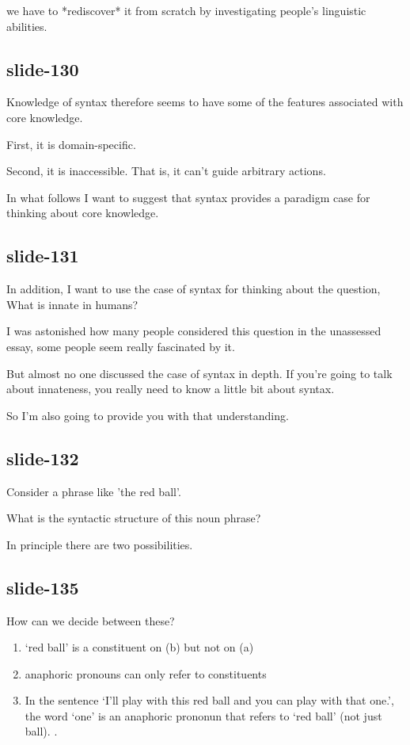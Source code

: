 \documentclass[12pt,\papersize]{extarticle}
\begin{document}
we have to *rediscover* it from scratch by investigating people's linguistic abilities.

\subsection{slide-130}
Knowledge of syntax therefore seems to have some of the features associated with core knowledge.

First, it is domain-specific.

Second, it is inaccessible.  That is, it can't guide arbitrary actions.

In what follows I want to suggest that syntax provides a paradigm case for thinking about core knowledge.

\subsection{slide-131}
In addition, I want to use the case of syntax for thinking about the question, What is innate in humans?

I was astonished how many people considered this question in the unassessed essay, some people seem really fascinated by it.

But almost no one discussed the case of syntax in depth.  If you're going to talk about innateness, you really need to know a little bit about syntax.

So I'm also going to provide you with that understanding.

\subsection{slide-132}
Consider a phrase like 'the red ball'.

What is the syntactic structure of this noun phrase?

In principle there are two possibilities.

\subsection{slide-135}
How can we decide between these?

\begin{enumerate}



\item ‘red ball’ is a constituent on (b) but not on (a)


\item anaphoric pronouns can only refer to constituents



                \item In the sentence ‘I’ll play with this red ball and you can play with that one.’, the word ‘one’ is an anaphoric prononun that refers to ‘red ball’ (not just ball).
                \citep{lidz:2003_what,lidz:2004_reaffirming}.




\end{enumerate}
\end{document}

